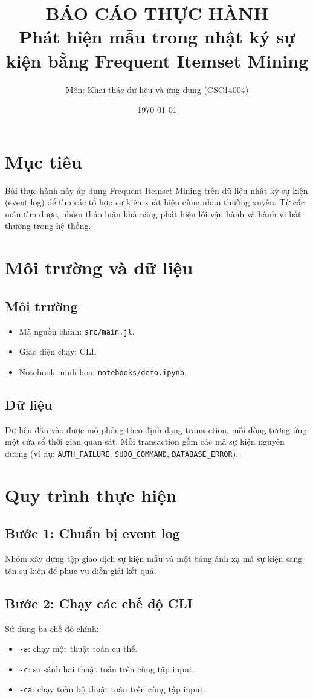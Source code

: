 \documentclass[12pt,a4paper]{article}
\title{BÁO CÁO THỰC HÀNH\\[4pt]
Phát hiện mẫu trong nhật ký sự kiện bằng Frequent Itemset Mining}
\author{Môn: Khai thác dữ liệu và ứng dụng (CSC14004)}
\date{\today}
\begin{document}
\maketitle

\section{Mục tiêu}
Bài thực hành này áp dụng Frequent Itemset Mining trên dữ liệu nhật ký sự kiện (event log) để tìm các tổ hợp sự kiện xuất hiện cùng nhau thường xuyên. Từ các mẫu tìm được, nhóm thảo luận khả năng phát hiện lỗi vận hành và hành vi bất thường trong hệ thống.

\section{Môi trường và dữ liệu}
\subsection{Môi trường}
\begin{itemize}[leftmargin=1.5em]
    \item Mã nguồn chính: \texttt{src/main.jl}.
    \item Giao diện chạy: CLI.
    \item Notebook minh họa: \texttt{notebooks/demo.ipynb}.
\end{itemize}

\subsection{Dữ liệu}
Dữ liệu đầu vào được mô phỏng theo định dạng transaction, mỗi dòng tương ứng một cửa sổ thời gian quan sát. Mỗi transaction gồm các mã sự kiện nguyên dương (ví dụ: \texttt{AUTH\_FAILURE}, \texttt{SUDO\_COMMAND}, \texttt{DATABASE\_ERROR}).

\section{Quy trình thực hiện}
\subsection{Bước 1: Chuẩn bị event log}
Nhóm xây dựng tập giao dịch sự kiện mẫu và một bảng ánh xạ mã sự kiện sang tên sự kiện để phục vụ diễn giải kết quả.

\subsection{Bước 2: Chạy các chế độ CLI}
Sử dụng ba chế độ chính:
\begin{itemize}[leftmargin=1.5em]
    \item \texttt{-a}: chạy một thuật toán cụ thể.
    \item \texttt{-c}: so sánh hai thuật toán trên cùng tập input.
    \item \texttt{-ca}: chạy toàn bộ thuật toán trên cùng tập input.
\end{itemize}
\end{document}
